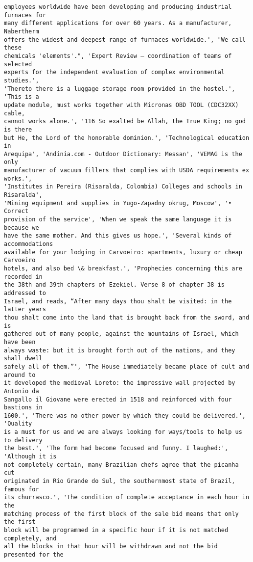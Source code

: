 \documentclass[10pt]{article}
\begin{document}
\begin{Verbatim}[commandchars=\\\{\}]
employees worldwide have been developing and producing industrial furnaces for
many different applications for over 60 years. As a manufacturer, Nabertherm
offers the widest and deepest range of furnaces worldwide.', "We call these
chemicals 'elements'.", 'Expert Review – coordination of teams of selected
experts for the independent evaluation of complex environmental studies.',
'Thereto there is a luggage storage room provided in the hostel.', 'This is a
update module, must works together with Micronas OBD TOOL (CDC32XX) cable,
cannot works alone.', '116 So exalted be Allah, the True King; no god is there
but He, the Lord of the honorable dominion.', 'Technological education in
Arequipa', 'Andinia.com - Outdoor Dictionary: Messan', 'VEMAG is the only
manufacturer of vacuum fillers that complies with USDA requirements ex works.',
'Institutes in Pereira (Risaralda, Colombia) Colleges and schools in Risaralda',
'Mining equipment and supplies in Yugo-Zapadny okrug, Moscow', '• Correct
provision of the service', 'When we speak the same language it is because we
have the same mother. And this gives us hope.', 'Several kinds of accommodations
available for your lodging in Carvoeiro: apartments, luxury or cheap Carvoeiro
hotels, and also bed \& breakfast.', 'Prophecies concerning this are recorded in
the 38th and 39th chapters of Ezekiel. Verse 8 of chapter 38 is addressed to
Israel, and reads, “After many days thou shalt be visited: in the latter years
thou shalt come into the land that is brought back from the sword, and is
gathered out of many people, against the mountains of Israel, which have been
always waste: but it is brought forth out of the nations, and they shall dwell
safely all of them.”', 'The House immediately became place of cult and around to
it developed the medieval Loreto: the impressive wall projected by Antonio da
Sangallo il Giovane were erected in 1518 and reinforced with four bastions in
1600.', 'There was no other power by which they could be delivered.', 'Quality
is a must for us and we are always looking for ways/tools to help us to delivery
the best.', 'The form had become focused and funny. I laughed:', 'Although it is
not completely certain, many Brazilian chefs agree that the picanha cut
originated in Rio Grande do Sul, the southernmost state of Brazil, famous for
its churrasco.', 'The condition of complete acceptance in each hour in the
matching process of the first block of the sale bid means that only the first
block will be programmed in a specific hour if it is not matched completely, and
all the blocks in that hour will be withdrawn and not the bid presented for the

\end{Verbatim}
\end{document}

